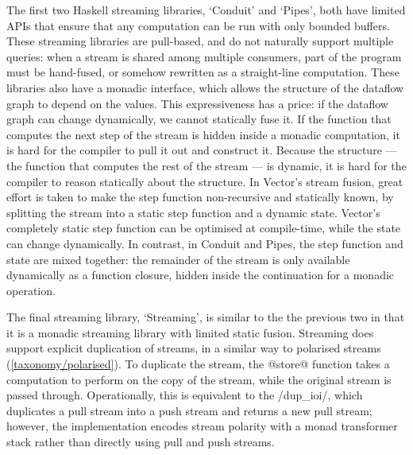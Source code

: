 The first two Haskell streaming libraries, `Conduit' and `Pipes', both have limited APIs that ensure that any computation can be run with only bounded buffers.
These streaming libraries are pull-based, and do not naturally support multiple queries: when a stream is shared among multiple consumers, part of the program must be hand-fused, or somehow rewritten as a straight-line computation.
These libraries also have a monadic interface, which allows the structure of the dataflow graph to depend on the values. This expressiveness has a price: if the dataflow graph can change dynamically, we cannot statically fuse it.
If the function that computes the next step of the stream is hidden inside a monadic computation, it is hard for the compiler to pull it out and construct it.
Because the structure --- the function that computes the rest of the stream --- is dynamic, it is hard for the compiler to reason statically about the structure.
In Vector's stream fusion, great effort is taken to make the step function non-recursive and statically known, by splitting the stream into a static step function and a dynamic state.
Vector's completely static step function can be optimised at compile-time, while the state can change dynamically.
In contrast, in Conduit and Pipes, the step function and state are mixed together: the remainder of the stream is only available dynamically as a function closure, hidden inside the continuation for a monadic operation.

The final streaming library, `Streaming', is similar to the the previous two in that it is a monadic streaming library with limited static fusion.
Streaming does support explicit duplication of streams, in a similar way to polarised streams (\cref{taxonomy/polarised}).
To duplicate the stream, the @store@ function takes a computation to perform on the copy of the stream, while the original stream is passed through.
Operationally, this is equivalent to the \Hs/dup_ioi/, which duplicates a pull stream into a push stream and returns a new pull stream; however, the implementation encodes stream polarity with a monad transformer stack rather than directly using pull and push streams.



